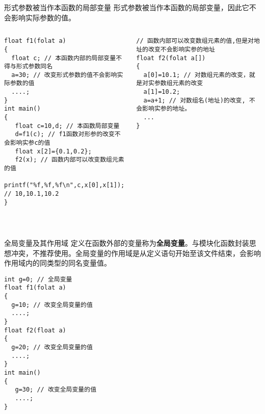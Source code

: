 \begin{frame}{形式参数被当作本函数的局部变量}
形式参数被当作本函数的局部变量，因此它不会影响实际参数的值。
\begin{columns}[T]
\begin{lstlisting}
float f1(folat a) 
{
  float c; // 本函数内部的局部变量不得与形式参数同名
  a=30; // 改变形式参数的值不会影响实际参数的值
  ....;
}
int main()
{
   float c=10,d; // 本函数局部变量
   d=f1(c); // f1函数对形参的改变不会影响实参c的值
   float x[2]={0.1,0.2}; 
   f2(x); // 函数内部可以改变数组元素的值
   printf("%f,%f,%f\n",c,x[0],x[1]); // 10,10.1,10.2  
}
\end{lstlisting}
\begin{lstlisting}
// 函数内部可以改变数组元素的值,但是对地址的改变不会影响实参的地址
float f2(folat a[]) 
{
  a[0]=10.1; // 对数组元素的改变，就是对实参数组元素的改变
  a[1]=10.2;
  a=a+1; // 对数组名(地址)的改变, 不会影响实参的地址。
  ...
}
\end{lstlisting}
\end{columns}
~\\
\end{frame}

\begin{frame}{全局变量及其作用域}
定义在函数外部的变量称为\textbf{全局变量}。与模块化函数封装思想冲突，不推荐使用。全局变量的作用域是从定义语句开始至该文件结束，会影响作用域内的同类型的同名变量值。 
\begin{lstlisting}
int g=0; // 全局变量
float f1(folat a) 
{
  g=10; // 改变全局变量的值
  ....;
}
float f2(float a)
{ 
  g=20; // 改变全局变量的值
  ....;
}
int main()
{
   g=30; // 改变全局变量的值
   ....;
}
\end{lstlisting}
\end{frame}




